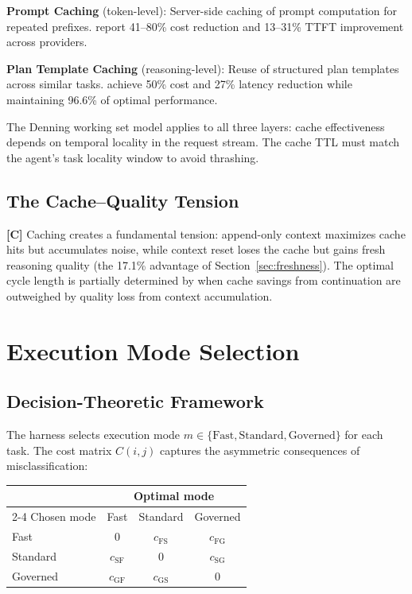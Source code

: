 \documentclass[11pt,a4paper]{article}
\theoremstyle{definition}
\theoremstyle{remark}
\begin{document}
\textbf{Prompt Caching} (token-level): Server-side caching of prompt computation for repeated prefixes. \citet{liang2026cache} report 41--80\% cost reduction and 13--31\% TTFT improvement across providers.

\textbf{Plan Template Caching} (reasoning-level): Reuse of structured plan templates across similar tasks. \citet{zhang2025apc} achieve 50\% cost and 27\% latency reduction while maintaining 96.6\% of optimal performance.

The Denning working set model \citep{denning1968working} applies to all three layers: cache effectiveness depends on temporal locality in the request stream. The cache TTL must match the agent's task locality window to avoid thrashing.

\subsection{The Cache--Quality Tension}

\textbf{[C]} Caching creates a fundamental tension: append-only context maximizes cache hits but accumulates noise, while context reset loses the cache but gains fresh reasoning quality (the 17.1\% advantage of Section~\ref{sec:freshness}). The optimal cycle length is partially determined by when cache savings from continuation are outweighed by quality loss from context accumulation.


\section{Execution Mode Selection}\label{sec:modes}

\subsection{Decision-Theoretic Framework}

The harness selects execution mode $m \in \{\text{Fast}, \text{Standard}, \text{Governed}\}$ for each task. The cost matrix $C(i,j)$ captures the asymmetric consequences of misclassification:

\begin{center}
\begin{tabular}{lccc}
\toprule
& \multicolumn{3}{c}{Optimal mode} \\
\cmidrule(l){2-4}
Chosen mode & Fast & Standard & Governed \\
\midrule
Fast & 0 & $c_{\mathrm{FS}}$ & $c_{\mathrm{FG}}$ \\
Standard & $c_{\mathrm{SF}}$ & 0 & $c_{\mathrm{SG}}$ \\
Governed & $c_{\mathrm{GF}}$ & $c_{\mathrm{GS}}$ & 0 \\
\bottomrule
\end{tabular}
\end{center}
\end{document}
